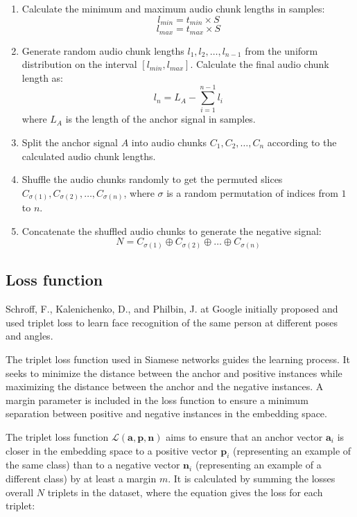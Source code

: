 \begin{enumerate}
\item Calculate the minimum and maximum audio chunk lengths in samples:
\begin{equation}
l_{min} = t_{min} \times S
\end{equation}
\begin{equation}
l_{max} = t_{max} \times S
\end{equation}
\item Generate random audio chunk lengths $l_1, l_2, \ldots, l_{n-1}$ from the uniform distribution on the interval $[l_{min}, l_{max}]$. Calculate the final audio chunk length as:
\begin{equation}
l_n = L_A - \sum_{i=1}^{n-1} l_i
\end{equation}
where $L_A$ is the length of the anchor signal in samples.
\item Split the anchor signal $A$ into audio chunks $C_1, C_2, \ldots, C_n$ according to the calculated audio chunk lengths.
\item Shuffle the audio chunks randomly to get the permuted slices $C_{\sigma(1)}, C_{\sigma(2)}, \ldots, C_{\sigma(n)}$, where $\sigma$ is a random permutation of indices from $1$ to $n$.
\item Concatenate the shuffled audio chunks to generate the negative signal:
\begin{equation}\label{eq:negative_signal}
N = C_{\sigma(1)} \oplus C_{\sigma(2)} \oplus \ldots \oplus C_{\sigma(n)}
\end{equation}
\end{enumerate}

\subsection{Loss function}

Schroff, F., Kalenichenko, D., and Philbin, J. at Google initially proposed and used triplet loss to learn face recognition of the same person at different poses and angles. \cite{Schroff2015FaceNet:Clustering}

The triplet loss function used in Siamese networks guides the learning process. It seeks to minimize the distance between the anchor and positive instances while maximizing the distance between the anchor and the negative instances. A margin parameter is included in the loss function to ensure a minimum separation between positive and negative instances in the embedding space.

The triplet loss function $\mathcal{L}(\mathbf{a}, \mathbf{p}, \mathbf{n})$ aims to ensure that an anchor vector $\mathbf{a}_i$ is closer in the embedding space to a positive vector $\mathbf{p}_i$ (representing an example of the same class) than to a negative vector $\mathbf{n}_i$ (representing an example of a different class) by at least a margin $m$. It is calculated by summing the losses overall $N$ triplets in the dataset, where the equation gives the loss for each triplet:

